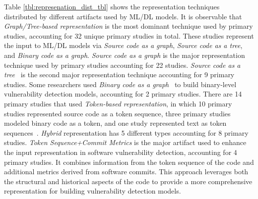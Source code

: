 
Table \ref{tbl:represenation_dist_tbl} shows the representation techniques distributed by different artifacts used by ML/DL models. It is observable that \textit{Graph/Tree-based representation} is the most dominant technique used by primary studies, accounting for 32 unique primary studies in total. These studies represent the input to ML/DL models via \textit{Source code as a graph}, \textit{Source code as a tree}, and \textit{Binary code as a graph}. \textit{Source code as a graph} is the major representation technique used by primary studies \cite{jeon2021autovas, tian2020bvdetector, liu2021combining, phan2017convolutional,
cheng2021deepwukong, zhou2019devign, kronjee2018discovering, zeng2021gcn2defect,
huang2021hunting, 3360588, zou2019mu, cao2022mvd,
ghaffarian2021neural, wu2021peculiar, zhuang2020smart, li2021sysevr,
zou2019mu, duan2019vulsniper, zheng2021vulspg, cheng2022path,
liu2021smart, ding2022velvet, yang2022source, zou2022mvulpreter,
nguyen2022mando, nguyen2022mando2} accounting for 22 studies. \textit{Source code as a tree}~\cite{dam2017automatic,
 shippey2019automatically,
 wang2016automatically,
 liu2020cd,
 wang2020combining,
 dinella2020hoppity,
 lin2017poster,
 li2017software,
 lin2019software,
 li2021vuldeelocator,
 zhuang2022just} is the second major representation technique accounting for 9 primary studies. Some researchers used \textit{Binary code as a graph}~\cite{phan2017convolutional, huang2021hunting} to build binary-level vulnerability detection models, accounting for 2 primary studies. 
There are 14 primary studies that used \textit{Token-based representation}, in which 10 primary studies represented source code as a token sequence, three primary studies modeled binary code as a token, and one study represented text as token sequences~\cite{zhou2017automated}. %
{\textit{Hybrid} representation has 5 different types accounting for 8 primary studies. \textit{Token Sequence+Commit Metrics} is the major artifact used to enhance the input representation in software vulnerability detection, accounting for 4 primary studies. It combines information from the token sequence of the code and additional metrics derived from software commits. This approach leverages both the structural and historical aspects of the code to provide a more comprehensive representation for building vulnerability detection models.}

